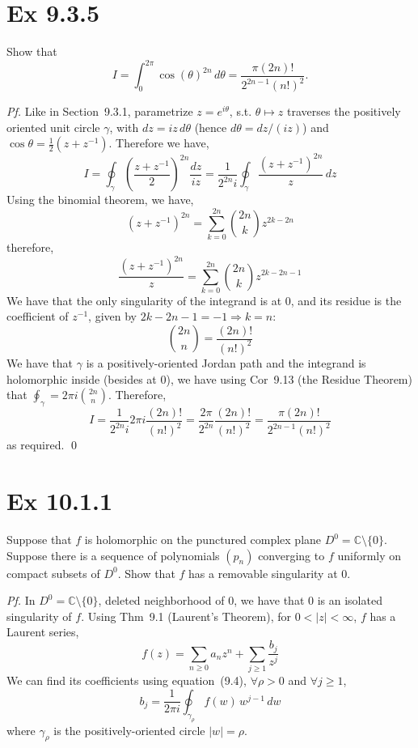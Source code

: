 \documentclass[a4paper]{article}
\newcommand{\C}{\mathbb{C}}
\begin{document}
\newpage
\section*{Ex 9.3.5}

\begin{prob}
Show that
\[
I=\int_{0}^{2\pi}\cos(\theta)^{2n}\,d\theta=\frac{\pi(2n)!}{2^{2n-1}(n!)^2}.
\]
\end{prob}

\textit{Pf.} Like in Section~9.3.1, parametrize $z=e^{i\theta}$, s.t. $\theta\mapsto z$ traverses the
positively oriented unit circle $\gamma$, with $dz=iz\,d\theta$ (hence
$d\theta=dz/(iz)$) and $\cos\theta=\tfrac12(z+z^{-1})$. Therefore we have,
\[
I=\oint_{\gamma}\left(\frac{z+z^{-1}}{2}\right)^{2n}\frac{dz}{iz}
=\frac{1}{2^{2n}i}\oint_{\gamma}\frac{(z+z^{-1})^{2n}}{z}\,dz
\]
Using the binomial theorem, we have,
\[
(z+z^{-1})^{2n}=\sum_{k=0}^{2n}\binom{2n}{k}z^{2k-2n}
\]
therefore,
\[
\frac{(z+z^{-1})^{2n}}{z}=\sum_{k=0}^{2n}\binom{2n}{k}z^{2k-2n-1}
\]
We have that the only singularity of the integrand is at $0$, and its residue is the coefficient of $z^{-1}$, given by $2k-2n-1=-1 \Rightarrow k=n$:
\[
\binom{2n}{n}=\frac{(2n)!}{(n!)^2}
\]
We have that $\gamma$ is a positively-oriented Jordan path and the integrand is holomorphic inside (besides at $0$), we have using Cor~9.13 (the Residue Theorem) that
$\oint_{\gamma}=2\pi i\binom{2n}{n}$. Therefore,
\[
I=\frac{1}{2^{2n}i} 2\pi i\frac{(2n)!}{(n!)^2}
=\frac{2\pi}{2^{2n}}\frac{(2n)!}{(n!)^2}
=\frac{\pi(2n)!}{2^{2n-1}(n!)^2}
\]
as required. \qed

\newpage
\section*{Ex 10.1.1}

\begin{prob}
Suppose that $f$ is holomorphic on the punctured complex plane
$D^0=\C\setminus\{0\}$. Suppose there is a sequence of polynomials $(p_n)$
converging to $f$ uniformly on compact subsets of $D^0$. Show that $f$ has a
removable singularity at $0$.
\end{prob}

\textit{Pf.} In $D^0=\C\setminus\{0\}$, deleted neighborhood of $0$, we have that $0$ is an isolated singularity of $f$. Using Thm~9.1 (Laurent's Theorem), for $0 < |z| < \infty$, $f$ has a Laurent series,
\[
f(z)=\sum_{n\ge 0}a_nz^n+\sum_{j\ge 1}\frac{b_j}{z^j}
\]
We can find its coefficients using equation~(9.4), $\forall \rho>0$ and $\forall j\ge 1$,
\[
b_j=\frac{1}{2\pi i}\oint_{\gamma_\rho}f(w)\,w^{j-1}\,dw
\]
where $\gamma_\rho$ is the positively-oriented circle $|w|=\rho$.
\end{document}
